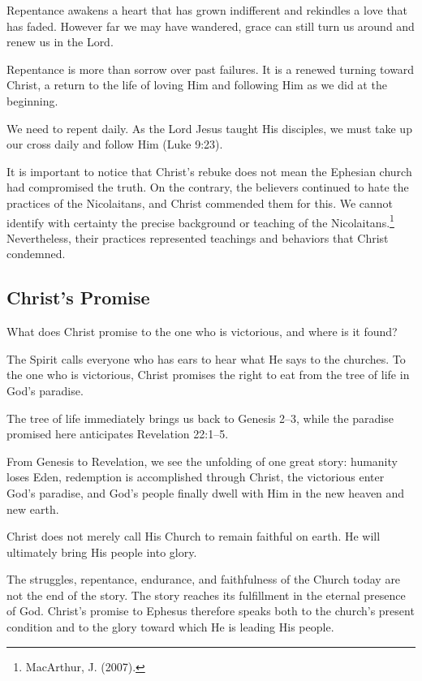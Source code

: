 Repentance awakens a heart that has grown indifferent and rekindles a love that has faded. However far we may have wandered, grace can still turn us around and renew us in the Lord.

Repentance is more than sorrow over past failures. It is a renewed turning toward Christ, a return to the life of loving Him and following Him as we did at the beginning.

We need to repent daily. As the Lord Jesus taught His disciples, we must take up our cross daily and follow Him (Luke 9:23).

It is important to notice that Christ's rebuke does not mean the Ephesian church had compromised the truth. On the contrary, the believers continued to hate the practices of the Nicolaitans, and Christ commended them for this. We cannot identify with certainty the precise background or teaching of the Nicolaitans.\footnote{MacArthur, J. (2007).} Nevertheless, their practices represented teachings and behaviors that Christ condemned.

\subsection{Christ's Promise}

\begin{ScriptureBox2}{What does Christ promise to the one who is victorious, and where is it found?}
\item[2:7] The Spirit calls everyone who has ears to hear what He says to the churches. To the one who is victorious, Christ promises the right to eat from the tree of life in God's paradise.
\end{ScriptureBox2}

The tree of life immediately brings us back to Genesis 2--3, while the paradise promised here anticipates Revelation 22:1--5.

From Genesis to Revelation, we see the unfolding of one great story: humanity loses Eden, redemption is accomplished through Christ, the victorious enter God's paradise, and God's people finally dwell with Him in the new heaven and new earth.

Christ does not merely call His Church to remain faithful on earth. He will ultimately bring His people into glory.

The struggles, repentance, endurance, and faithfulness of the Church today are not the end of the story. The story reaches its fulfillment in the eternal presence of God. Christ's promise to Ephesus therefore speaks both to the church's present condition and to the glory toward which He is leading His people.

